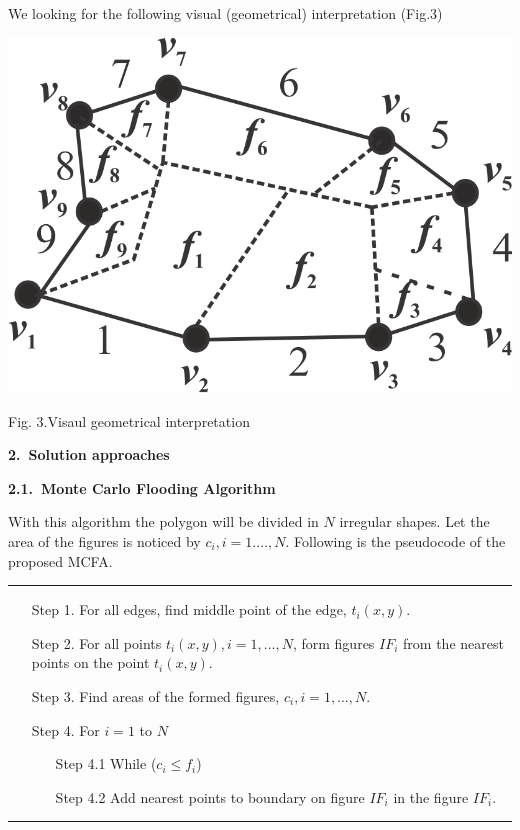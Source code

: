 \documentclass[11pt,leqno]{book}
\newcommand{\sect}[1]{\vskip7mm\par{\large \bf #1}}
\newcommand{\subsect}[1]{\vskip 3mm\par{\bf#1}}
\begin{document}
We looking for the following visual (geometrical) interpretation (Fig.3)

\begin{center}
\includegraphics  {pic03.png}

Fig. 3.{Visaul geometrical interpretation}
\label{fig3}
\end{center}

\sect{2.~Solution approaches}

\subsect{2.1.~Monte Carlo Flooding Algorithm}

With this algorithm the polygon will be divided in $N$ irregular shapes. Let the area of the figures is noticed by $c_i, i = 1. \ldots, N$.  Following is the pseudocode of the proposed MCFA.

\noindent\rule{\textwidth}{1pt}
\begin{itemize}
\item[Step 1.]  For all edges, find middle point of the edge, $t_i(x,y)$.
\item[Step 2.]  For all points $t_i(x,y), i=1,\ldots, N$, form figures $IF_i$ from the nearest points on the point $t_i(x,y)$. 
\item[Step 3.] Find areas of the formed figures, $c_i, i = 1, \ldots, N$.
\item[Step 4.] For $i = 1$ to $N$
\begin{itemize}
  \item[Step 4.1]  While ($c_i \leq f_i$)
  \item[Step 4.2]  Add nearest points to boundary on figure $IF_i$ in the figure $IF_i$. 
\end{itemize}
\end{itemize}
\noindent\rule{\textwidth}{1pt}
\end{document}
